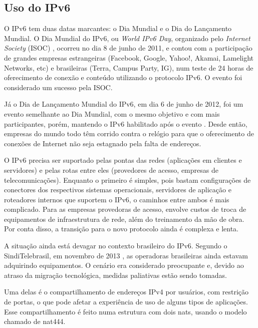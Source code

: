 
\subsection*{Uso do IPv6}

O IPv6 tem duas datas marcantes: o Dia Mundial e o Dia do Lançamento Mundial. O Dia
Mundial do IPv6, ou \emph{World IPv6 Day}, organizado pelo \emph{Internet Society}
(ISOC) \cite{site:isoc-ipv6day}, ocorreu no dia 8 de junho de 2011, e contou com a
participação de grandes empresas estrangeiras (Facebook, Google, Yahoo!, Akamai,
Lamelight Networks, etc) e brasileiras (Terra, Campus Party, IG), num teste de 24 horas
de oferecimento de conexão e conteúdo utilizando o protocolo IPv6. O evento foi
considerado um sucesso pela ISOC.

Já o Dia de Lançamento Mundial do IPv6, em dia 6 de junho de 2012, foi um evento
semelhante ao Dia Mundial, com o mesmo objetivo e com mais participantes, porém,
mantendo o IPv6 habilitado após o evento \cite{site:isoc-ipv6launch}. Desde então,
empresas do mundo todo têm corrido contra o relógio para que o oferecimento de conexões
de Internet não seja estagnado pela falta de endereços.

O IPv6 precisa ser suportado pelas pontas das redes (aplicações em clientes e
servidores) e pelas rotas entre eles (provedores de acesso, empresas de
telecomunicações). Enquanto o primeiro é simples, pois bastam configurações de
conectores dos respectivos sistemas operacionais, servidores de aplicação e roteadores
internos que suportem o IPv6, o caminhos entre ambos é mais complicado. Para as empresas
provedoras de acesso, envolve custos de troca de equipamentos de infraestrutura de
rede, além do treinamento da mão de obra. Por conta disso, a transição para o novo
protocolo ainda é complexa e lenta.

\newpage
A situação ainda está devagar no contexto brasileiro do IPv6. Segundo o SindiTelebrasil,
em novembro de 2013 \cite{site:ipv6brasil}, as operadoras brasileiras ainda estavam
adquirindo equipamentos. O cenário era considerado preocupante e, devido ao atraso da
migração tecnológica, medidas paliativas estão sendo tomadas.

Uma delas é o compartilhamento de endereços IPv4 por usuários, com restrição de portas,
o que pode afetar a experiência de uso de alguns tipos de aplicações. Esse
compartilhamento é feito numa estrutura com dois \glspl*{nat}, usando o modelo chamado
de \gls*{nat}444.

